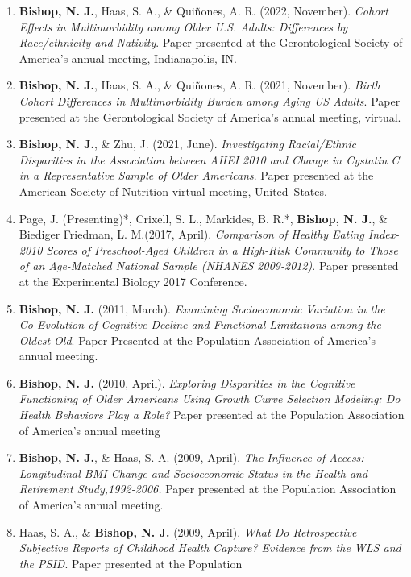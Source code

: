 \documentclass[
]{article}
\begin{document}
\begin{enumerate}
\def\labelenumi{\arabic{enumi}.}
\item
  \textbf{Bishop, N. J.}, Haas, S. A., \& Quiñones, A. R. (2022,
  November). \emph{Cohort Effects in Multimorbidity among Older U.S.
  Adults: Differences by Race/ethnicity and Nativity}. Paper presented
  at the Gerontological Society of America's annual meeting,
  Indianapolis, IN.
\item
  \textbf{Bishop, N. J.}, Haas, S. A., \& Quiñones, A. R. (2021,
  November). \emph{Birth Cohort Differences in Multimorbidity Burden
  among Aging US Adults}. Paper presented at the Gerontological Society
  of America's annual meeting, virtual.
\item
  \textbf{Bishop, N. J.}, \& Zhu, J. (2021, June). \emph{Investigating
  Racial/Ethnic Disparities in the Association between AHEI 2010 and
  Change in Cystatin C in a Representative Sample of Older Americans}.
  Paper presented at the American Society of Nutrition virtual meeting,
  United~States.
\item
  Page, J. (Presenting)*, Crixell, S. L., Markides, B. R.*,
  \textbf{Bishop, N. J.}, \& Biediger Friedman, L. M.(2017, April).
  \emph{Comparison of Healthy Eating Index-2010 Scores of Preschool-Aged
  Children in a High-Risk Community to Those of an Age-Matched National
  Sample (NHANES 2009-2012)}. Paper presented at the Experimental
  Biology 2017 Conference.
\item
  \textbf{Bishop, N. J.} (2011, March). \emph{Examining Socioeconomic
  Variation in the Co-Evolution of Cognitive Decline and Functional
  Limitations among the Oldest Old}. Paper Presented at the Population
  Association of America's annual meeting.
\item
  \textbf{Bishop, N. J.} (2010, April). \emph{Exploring Disparities in
  the Cognitive Functioning of Older Americans Using Growth Curve
  Selection Modeling: Do Health Behaviors Play a Role?} Paper presented
  at the Population Association of America's annual meeting
\item
  \textbf{Bishop, N. J.}, \& Haas, S. A. (2009, April). \emph{The
  Influence of Access: Longitudinal BMI Change and Socioeconomic Status
  in the Health and Retirement Study,1992-2006.} Paper presented at the
  Population Association of America's annual meeting.
\item
  Haas, S. A., \& \textbf{Bishop, N. J.} (2009, April). \emph{What Do
  Retrospective Subjective Reports of Childhood Health Capture? Evidence
  from the WLS and the PSID}. Paper presented at the Population

\end{enumerate}
\end{document}
